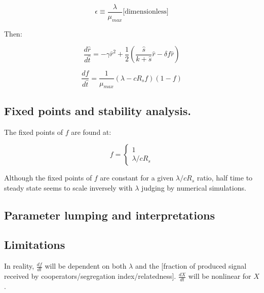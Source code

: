 \documentclass[11pt]{amsart}
\begin{document}
\begin{flushleft}
				\[ \epsilon \equiv \frac{\lambda}{\mu_{max}} \textrm{[dimensionless]} \]
				
				Then:
				
				\begin{equation}
					\frac{d\hat{r}}{d\hat{t}} = -\gamma\hat{r}^2 + \frac{1}{2}(\frac{\hat{s}}{k + \hat{s}}\hat{r} - \delta f\hat{r})
					\label{hss:nd:drdt}
				\end{equation}
				
				\begin{equation}
					\frac{df}{d\hat{t}} = \frac{1}{\mu_{max}}(\lambda - cR_sf)(1 - f)
					\label{hss:nd:dfdt}
				\end{equation}
			\end{flushleft}

		\subsection{Fixed points and stability analysis.}
			\begin{flushleft}	
				
				The fixed points of \( f \) are found at:
				
				\begin{equation}
					f =
						\begin{cases}
							1 \\
							\lambda / cR_s
						\end{cases}
				\end{equation}
				
				Although the fixed points of \(f\) are constant for a given \(\lambda / cR_s\) ratio, half time to steady state seems to scale inversely with \(\lambda\) judging by numerical simulations.
			\end{flushleft}
			
		\subsection{Parameter lumping and interpretations}
			\begin{flushleft}
				
			\end{flushleft}

		\subsection{Limitations}
			\begin{flushleft}
				
				In reality, \(\frac{df}{dt}\) will be dependent on both \(\lambda\) and the [fraction of produced signal received by cooperators/segregation index/relatedness]. \(\frac{dX}{dt}\) will be nonlinear for \(X\).
				
			\end{flushleft}
\end{document}
